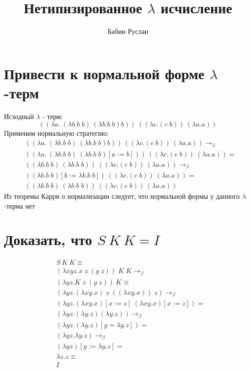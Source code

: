 \documentclass[16pt]{article}
\title{Нетипизированное $\lambda$ исчисление}
\author{Бабин Руслан}
\date{}
\begin{document}
\maketitle

\section{Привести к нормальной форме $\lambda$ -терм}
Исходный $\lambda$ - терм:
\begin{equation*}
    ((\lambda a.\:(\lambda b.b\;b)\:(\lambda b. b\;b) b))\:((\lambda c.(c\;b))\:(\lambda a.a)) 
\end{equation*}
Применим нормальную стратегию:
\begin{align*}
    & ((\lambda a.\:(\lambda b.b\;b)\:(\lambda b. b\;b) b))\:((\lambda c.(c\;b))\:(\lambda a.a)) \to_\beta \\ 
    & ((\lambda a.\:(\lambda b.b\;b)\:(\lambda b. b\;b)[a := b]))\:((\lambda c.(c\;b))\:(\lambda a.a)) = \\
    & ((\lambda b.b\;b)\:(\lambda b. b\;b))\:((\lambda c.(c\;b))\:(\lambda a.a)) \to_\beta \\
    & ((\lambda b.b\;b)[b := \lambda b.b\;b])\:((\lambda c.(c\;b))\:(\lambda a.a)) = \\
    & ((\lambda b.b\;b)\:(\lambda b. b\;b))\:((\lambda c.(c\;b))\:(\lambda a.a)) 
\end{align*}
Из теоремы Карри о нормализации следует, что нормальной формы у данного $\lambda$-терма нет

\section{Доказать, что $S\ K\ K = I$}
\begin{align*}
    & S\ K\ K \equiv \\
    & (\lambda x y z.x\;z\;(y\;z))\;K\;K \to_\beta \\
    & (\lambda y z.K\;z\;(y \;z)) \ K \equiv \\
    & (\lambda y z.(\lambda x y.x)\;z\;((\lambda x y.x))\;z) \to_\beta \\
    & (\lambda y z.(\lambda x y.x)[x := z]\;(\lambda x y.x)[x := z]) = \\
    & (\lambda y z.(\lambda y.z)(\lambda y.z)) \to_\beta \\
    & (\lambda y z.(\lambda y.z)[y = \lambda y.z]) = \\
    & (\lambda y z.\lambda y.z) \to_\beta \\
    & (\lambda y z)[y := \lambda y.z] = \\
    & \lambda z.z \equiv \\
    & I
\end{align*}
\end{document}
